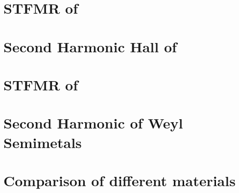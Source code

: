 \label{spin-tocharge-conversion}

\section{STFMR of \nbse}

\section{Second Harmonic Hall of \nbse}

\section{STFMR of \nbse}

\section{Second Harmonic of Weyl Semimetals}

\section{Comparison of different materials}


